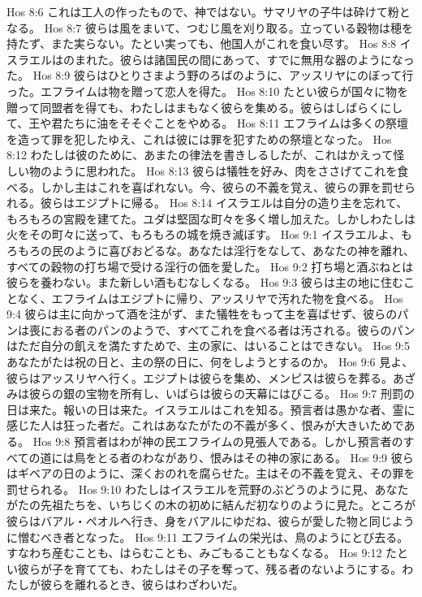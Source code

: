 Hos 8:6  これは工人の作ったもので、神ではない。サマリヤの子牛は砕けて粉となる。
Hos 8:7  彼らは風をまいて、つむじ風を刈り取る。立っている穀物は穂を持たず、また実らない。たとい実っても、他国人がこれを食い尽す。
Hos 8:8  イスラエルはのまれた。彼らは諸国民の間にあって、すでに無用な器のようになった。
Hos 8:9  彼らはひとりさまよう野のろばのように、アッスリヤにのぼって行った。エフライムは物を贈って恋人を得た。
Hos 8:10  たとい彼らが国々に物を贈って同盟者を得ても、わたしはまもなく彼らを集める。彼らはしばらくにして、王や君たちに油をそそぐことをやめる。
Hos 8:11  エフライムは多くの祭壇を造って罪を犯したゆえ、これは彼には罪を犯すための祭壇となった。
Hos 8:12  わたしは彼のために、あまたの律法を書きしるしたが、これはかえって怪しい物のように思われた。
Hos 8:13  彼らは犠牲を好み、肉をささげてこれを食べる。しかし主はこれを喜ばれない。今、彼らの不義を覚え、彼らの罪を罰せられる。彼らはエジプトに帰る。
Hos 8:14  イスラエルは自分の造り主を忘れて、もろもろの宮殿を建てた。ユダは堅固な町々を多く増し加えた。しかしわたしは火をその町々に送って、もろもろの城を焼き滅ぼす。
Hos 9:1  イスラエルよ、もろもろの民のように喜びおどるな。あなたは淫行をなして、あなたの神を離れ、すべての穀物の打ち場で受ける淫行の価を愛した。
Hos 9:2  打ち場と酒ぶねとは彼らを養わない。また新しい酒もむなしくなる。
Hos 9:3  彼らは主の地に住むことなく、エフライムはエジプトに帰り、アッスリヤで汚れた物を食べる。
Hos 9:4  彼らは主に向かって酒を注がず、また犠牲をもって主を喜ばせず、彼らのパンは喪におる者のパンのようで、すべてこれを食べる者は汚される。彼らのパンはただ自分の飢えを満たすためで、主の家に、はいることはできない。
Hos 9:5  あなたがたは祝の日と、主の祭の日に、何をしようとするのか。
Hos 9:6  見よ、彼らはアッスリヤへ行く。エジプトは彼らを集め、メンピスは彼らを葬る。あざみは彼らの銀の宝物を所有し、いばらは彼らの天幕にはびこる。
Hos 9:7  刑罰の日は来た。報いの日は来た。イスラエルはこれを知る。預言者は愚かな者、霊に感じた人は狂った者だ。これはあなたがたの不義が多く、恨みが大きいためである。
Hos 9:8  預言者はわが神の民エフライムの見張人である。しかし預言者のすべての道には鳥をとる者のわながあり、恨みはその神の家にある。
Hos 9:9  彼らはギベアの日のように、深くおのれを腐らせた。主はその不義を覚え、その罪を罰せられる。
Hos 9:10  わたしはイスラエルを荒野のぶどうのように見、あなたがたの先祖たちを、いちじくの木の初めに結んだ初なりのように見た。ところが彼らはバアル・ペオルへ行き、身をバアルにゆだね、彼らが愛した物と同じように憎むべき者となった。
Hos 9:11  エフライムの栄光は、鳥のようにとび去る。すなわち産むことも、はらむことも、みごもることもなくなる。
Hos 9:12  たとい彼らが子を育てても、わたしはその子を奪って、残る者のないようにする。わたしが彼らを離れるとき、彼らはわざわいだ。
